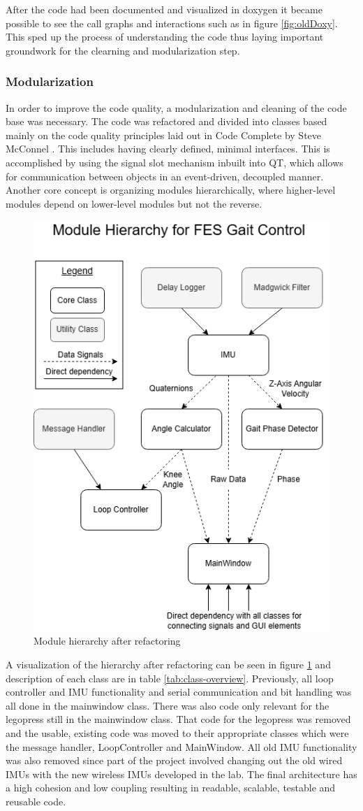 After the code had been documented and visualized in doxygen it became possible to see the call graphs and interactions such as in figure \ref{fig:oldDoxy}. This sped up the process of understanding the code thus laying important groundwork for the clearning and modularization step.

\subsubsection{Modularization}
In order to improve the code quality, a modularization and cleaning of the code base was necessary. The code was refactored and divided into classes based mainly on the code quality principles laid out in Code Complete by Steve McConnel \cite{steve_mcconnell_code_nodate}. This includes having clearly defined, minimal interfaces. This is accomplished by using the signal slot mechanism inbuilt into QT, which allows for communication between objects in an event-driven, decoupled manner. Another core concept is organizing modules hierarchically, where higher-level modules depend on lower-level modules but not the reverse. 

\begin{figure} [h]
    \centering
    \includegraphics[width=0.6\linewidth]{images/gaitcontrol.png}
    \caption{Module hierarchy after refactoring}
    \label{fig:modulehier}
\end{figure}

A visualization of the hierarchy after refactoring can be seen in figure \ref{fig:modulehier} and description of each class are in table \ref{tab:class-overview}. Previously, all loop controller and IMU functionality and serial communication and bit handling was all done in the mainwindow class. There was also code only relevant for the legopress still in the mainwindow class. That code for the legopress was removed and the usable, existing code was moved to their appropriate classes which were the message handler, LoopController and MainWindow. All old IMU functionality was also removed since part of the project involved changing out the old wired IMUs with the new wireless IMUs developed in the lab. The final architecture has a high cohesion and low coupling resulting in readable, scalable, testable and reusable code.


